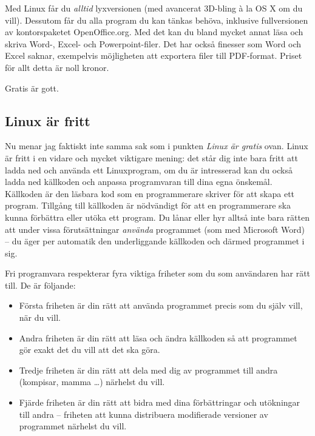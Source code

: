 \documentclass[a4paper,final]{memoir} %
\begin{document}
Med Linux får du \textit{alltid} lyxversionen (med avancerat 3D-bling à la OS X om du vill). Dessutom får du alla program du kan tänkas behöva, inklusive fullversionen av kontorspaketet OpenOffice.org. Med det kan du bland mycket annat läsa och skriva Word-, Excel- och Powerpoint-filer. Det har också finesser som Word och Excel saknar, exempelvis möjligheten att exportera filer till PDF-format. Priset för allt detta är noll kronor.

Gratis är gott.

\subsection{Linux är fritt}


Nu menar jag faktiskt inte samma sak som i punkten \textit{Linux är gratis} ovan. Linux är fritt i en vidare och mycket viktigare mening: det står dig inte bara fritt att ladda ned och använda ett Linuxprogram, om du är intresserad kan du också ladda ned källkoden och anpassa programvaran till dina egna önskemål. Källkoden är den läsbara kod som en programmerare skriver för att skapa ett program. Tillgång till källkoden är nödvändigt för att en programmerare ska kunna förbättra eller utöka ett program. Du lånar eller hyr alltså inte bara rätten att under vissa förutsättningar \textit{använda} programmet (som med Microsoft Word) -- du äger per automatik den underliggande källkoden och därmed programmet i sig. 

Fri programvara respekterar fyra viktiga friheter som du som användaren har rätt till. De är följande:

\begin{itemize}

\item Första friheten är din rätt att använda programmet precis som du själv vill, när du vill.

\item Andra friheten är din rätt att läsa och ändra källkoden så att programmet gör exakt det du vill att det ska göra.

\item Tredje friheten är din rätt att dela med dig av programmet till andra (kompisar, mamma \ldots{}) närhelst du vill.

\item Fjärde friheten är din rätt att bidra med dina förbättringar och ut\-ök\-ning\-ar till andra -- friheten att kunna distribuera modifierade versioner av programmet närhelst du vill.

\end{itemize}
\end{document}
